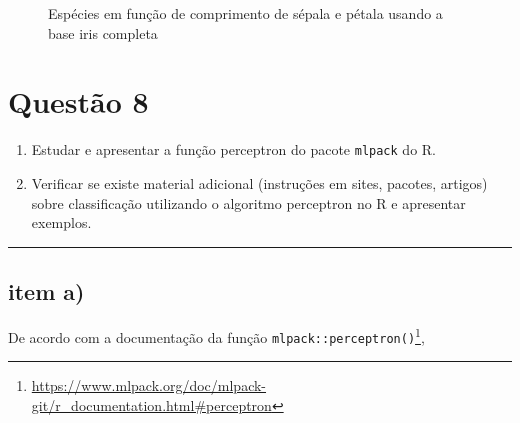 \documentclass[
  a4paperpaper,
]{article}
\providecommand{\tightlist}{%
  \setlength{\itemsep}{0pt}\setlength{\parskip}{0pt}}\usepackage{longtable,booktabs,array}
\begin{document}
\begin{figure}[H]


\caption{\label{fig-iris3species}Espécies em função de comprimento de
sépala e pétala usando a base iris completa}

\end{figure}%

\newpage{}

\section{Questão 8}\label{questuxe3o-8}

\begin{enumerate}
\def\labelenumi{\alph{enumi})}
\tightlist
\item
  Estudar e apresentar a função perceptron do pacote \texttt{mlpack} do
  R.
\item
  Verificar se existe material adicional (instruções em sites, pacotes,
  artigos) sobre classificação utilizando o algoritmo perceptron no R e
  apresentar exemplos.
\end{enumerate}

\begin{center}\rule{0.5\linewidth}{0.5pt}\end{center}

\subsection{item a)}\label{item-a}

De acordo com a documentação da função
\texttt{mlpack::perceptron()}\footnote{\url{https://www.mlpack.org/doc/mlpack-git/r_documentation.html\#perceptron}},
\end{document}
